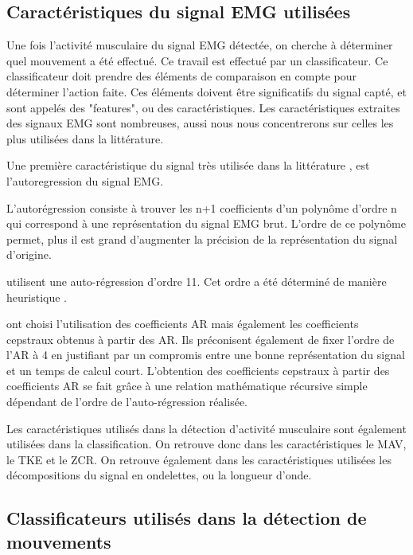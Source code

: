 \documentclass[letterpaper, twoside, 12pt, memoire, creativecommons, hyperref]{thETS}
\begin{document}
\subsection{Caractéristiques du signal EMG utilisées}

Une fois l’activité musculaire du signal EMG détectée, on cherche à déterminer quel mouvement a été effectué. Ce travail est effectué par un classificateur. Ce classificateur doit prendre des éléments de comparaison en compte pour déterminer l’action faite. Ces éléments doivent être significatifs du signal capté, et sont appelés des "features", ou des caractéristiques. 
Les caractéristiques extraites des signaux EMG sont nombreuses, aussi nous nous concentrerons sur celles les plus utilisées dans la littérature. 

Une première caractéristique du signal très utilisée dans la littérature \citep{Chang1996, Peleg2002, Maheu2011}, est l'autoregression du signal EMG.

L’autorégression consiste à trouver les n+1 coefficients d’un polynôme d’ordre n  qui correspond à une représentation du signal EMG brut. L'ordre de ce polynôme permet, plus il est grand d'augmenter la précision de la représentation du signal d'origine. 

\cite{Peleg2002} utilisent une auto-régression d’ordre 11. Cet ordre a été déterminé de manière heuristique \citep{Peleg2002}.

\cite{Chang1996} ont choisi l'utilisation des coefficients AR mais également les coefficients cepstraux obtenus à partir des AR. Ils préconisent également de fixer l’ordre de l’AR à 4 en justifiant par un compromis entre une bonne représentation du signal  et un temps de calcul court. L’obtention des coefficients cepstraux à partir des coefficients AR se fait grâce à une relation mathématique récursive simple dépendant de l’ordre de l'auto-régression réalisée. %

Les caractéristiques utilisés dans la détection d'activité musculaire sont également utilisées dans la classification. On retrouve donc dans les caractéristiques le MAV, le TKE et le ZCR. On retrouve également dans les caractéristiques utilisées les décompositions du signal en ondelettes, ou la longueur d'onde.

\subsection{Classificateurs utilisés dans la détection de mouvements}
\end{document}
